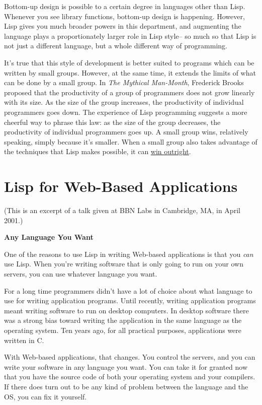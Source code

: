 \documentclass[12pt]{book}
\begin{document}
Bottom-up design is possible to a certain degree in languages other than
Lisp. Whenever you see library functions, bottom-up design is happening.
However, Lisp gives you much broader powers in this department, and
augmenting the language plays a proportionately larger role in Lisp
style-- so much so that Lisp is not just a different language, but a
whole different way of programming.

It's true that this style of development is better suited to programs
which can be written by small groups. However, at the same time, it
extends the limits of what can be done by a small group. In \emph{The
Mythical Man-Month}, Frederick Brooks proposed that the productivity of
a group of programmers does not grow linearly with its size. As the size
of the group increases, the productivity of individual programmers goes
down. The experience of Lisp programming suggests a more cheerful way to
phrase this law: as the size of the group decreases, the productivity of
individual programmers goes up. A small group wins, relatively speaking,
simply because it's smaller. When a small group also takes advantage of
the techniques that Lisp makes possible, it can \href{avg.html}{win
outright}.
\chapter{Lisp for Web-Based Applications}

(This is an excerpt of a talk given at BBN Labs in Cambridge, MA, in
April 2001.)

\textbf{Any Language You Want}

One of the reasons to use Lisp in writing Web-based applications is that
you \emph{can} use Lisp. When you're writing software that is only going
to run on your own servers, you can use whatever language you want.

For a long time programmers didn't have a lot of choice about what
language to use for writing application programs. Until recently,
writing application programs meant writing software to run on desktop
computers. In desktop software there was a strong bias toward writing
the application in the same language as the operating system. Ten years
ago, for all practical purposes, applications were written in C.

With Web-based applications, that changes. You control the servers, and
you can write your software in any language you want. You can take it
for granted now that you have the source code of both your operating
system and your compilers. If there does turn out to be any kind of
problem between the language and the OS, you can fix it yourself.
\end{document}
